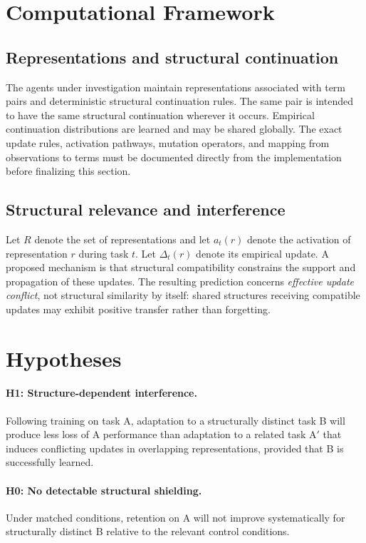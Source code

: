 \documentclass[11pt]{article}
\begin{document}
\section{Computational Framework}
\subsection{Representations and structural continuation}
The agents under investigation maintain representations associated with term pairs and deterministic structural continuation rules. The same pair is intended to have the same structural continuation wherever it occurs. Empirical continuation distributions are learned and may be shared globally. The exact update rules, activation pathways, mutation operators, and mapping from observations to terms must be documented directly from the implementation before finalizing this section.

\subsection{Structural relevance and interference}
Let $R$ denote the set of representations and let $a_t(r)$ denote the activation of representation $r$ during task $t$. Let $\Delta_t(r)$ denote its empirical update. A proposed mechanism is that structural compatibility constrains the support and propagation of these updates. The resulting prediction concerns \emph{effective update conflict}, not structural similarity by itself: shared structures receiving compatible updates may exhibit positive transfer rather than forgetting.

\section{Hypotheses}
\paragraph{H1: Structure-dependent interference.}
Following training on task A, adaptation to a structurally distinct task B will produce less loss of A performance than adaptation to a related task A$'$ that induces conflicting updates in overlapping representations, provided that B is successfully learned.

\paragraph{H0: No detectable structural shielding.}
Under matched conditions, retention on A will not improve systematically for structurally distinct B relative to the relevant control conditions.
\end{document}
